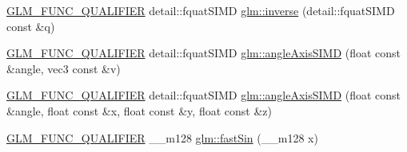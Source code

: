 \begin{DoxyCompactItemize}
\item 
\hyperlink{setup_8hpp_a33fdea6f91c5f834105f7415e2a64407}{G\+L\+M\+\_\+\+F\+U\+N\+C\+\_\+\+Q\+U\+A\+L\+I\+F\+I\+ER} detail\+::fquat\+S\+I\+MD \hyperlink{namespaceglm_ad723ad1f3ef20438ade0e0c95002f187}{glm\+::inverse} (detail\+::fquat\+S\+I\+MD const \&q)
\item 
\hyperlink{setup_8hpp_a33fdea6f91c5f834105f7415e2a64407}{G\+L\+M\+\_\+\+F\+U\+N\+C\+\_\+\+Q\+U\+A\+L\+I\+F\+I\+ER} detail\+::fquat\+S\+I\+MD \hyperlink{namespaceglm_a635900a97b69fe25d76c029f130a1c8f}{glm\+::angle\+Axis\+S\+I\+MD} (float const \&angle, vec3 const \&v)
\item 
\hyperlink{setup_8hpp_a33fdea6f91c5f834105f7415e2a64407}{G\+L\+M\+\_\+\+F\+U\+N\+C\+\_\+\+Q\+U\+A\+L\+I\+F\+I\+ER} detail\+::fquat\+S\+I\+MD \hyperlink{namespaceglm_a8ae8890bd658ce7217abc2112e3dca35}{glm\+::angle\+Axis\+S\+I\+MD} (float const \&angle, float const \&x, float const \&y, float const \&z)
\item 
\hyperlink{setup_8hpp_a33fdea6f91c5f834105f7415e2a64407}{G\+L\+M\+\_\+\+F\+U\+N\+C\+\_\+\+Q\+U\+A\+L\+I\+F\+I\+ER} \+\_\+\+\_\+m128 \hyperlink{namespaceglm_a81de908720e51f26e86e18d37aa5cc3b}{glm\+::fast\+Sin} (\+\_\+\+\_\+m128 x)
\end{DoxyCompactItemize}

